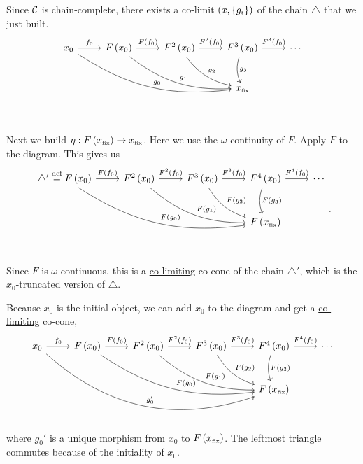 \begin{enumcirc}
	Since $\mathcal{C}$ is chain-complete, there exists a co-limit $\left( x,
			\left\{ g_i \right\} \right)$ of the chain $\triangle$ that we just built.
	\[
		\begin{tikzcd}[row sep=large]
			x_0 \arrow[r, "f_0"] \arrow[drrr, "g_0", bend right = 20]          &
			F\prths{x_0} \arrow[r, "F\prths{f_0}"] \arrow[drr, "g_1", bend right = 20]  &
			F^2\prths{x_0} \arrow[r, "F^2\prths{f_0}"] \arrow[dr, "g_2", bend right = 20] &
			F^3\prths{x_0} \arrow[r, "F^3\prths{f_0}"] \arrow[d, "g_3", bend right = 20]  & \cdots \\
			& & & \subsctext{x}{fix}  \\
		\end{tikzcd}
	\]
	\item
	Next we build $\eta: F\left( x_{\textrm{\tiny fix}} \right) \to x_{\textrm{\tiny fix}}$.
	Here we use the $\omega$-continuity of $F$.
	Apply $F$ to the diagram.
	This gives us
	\[
		\begin{tikzcd}[row sep=large]
			\triangle' \defeq
			F\prths{x_0} \arrow[r, "F\prths{f_0}"] \arrow[drrr, "F\prths{g_0}", bend right = 20]          &
			F^2\prths{x_0} \arrow[r, "F^2\prths{f_0}"] \arrow[drr, "F\prths{g_1}", bend right = 20]  &
			F^3\prths{x_0} \arrow[r, "F^3\prths{f_0}"] \arrow[dr, "F\prths{g_2}", bend right = 20] &
			F^4\prths{x_0} \arrow[r, "F^4\prths{f_0}"] \arrow[d, "F\prths{g_3}", bend right = 20]  & \cdots \\
			& & & F\prths{\subsctext{x}{fix}}  \\
		\end{tikzcd}
		.
	\]
	Since $F$ is $\omega$-continuous, this is a \ul{co-limiting} co-cone of the
	chain $\triangle'$, which is the $x_0$-truncated version of $\triangle$.
	\item
	Because $x_0$ is the initial object, we can add $x_0$ to the diagram and get a
	\ul{co-limiting} co-cone,
	\[
		\begin{tikzcd}[row sep=large]
			x_0 \arrow[r, "f_0"] \arrow[drrrr, "g_0'", bend right = 30]          &
			F\prths{x_0} \arrow[r, "F\prths{f_0}"] \arrow[drrr, "F\prths{g_0}", bend right = 20]          &
			F^2\prths{x_0} \arrow[r, "F^2\prths{f_0}"] \arrow[drr, "F\prths{g_1}", bend right = 20]  &
			F^3\prths{x_0} \arrow[r, "F^3\prths{f_0}"] \arrow[dr, "F\prths{g_2}", bend right = 20] &
			F^4\prths{x_0} \arrow[r, "F^4\prths{f_0}"] \arrow[d, "F\prths{g_3}", bend right = 20]  & \cdots \\
			& & & & F\prths{\subsctext{x}{fix}}  \\
		\end{tikzcd}
	\]
	where $g_0'$ is a unique morphism from $x_0$ to $F\left( x_{\textrm{\tiny fix}} \right)$.
	The leftmost triangle commutes because of the initiality of $x_0$.


\end{enumcirc}
